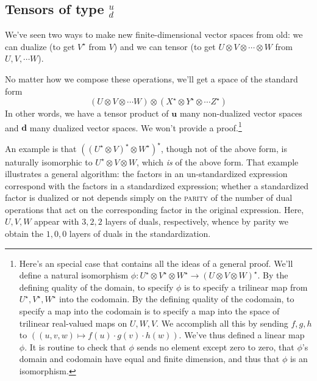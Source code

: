        \subsection{Tensors of type $^u_d$}
            We've seen two ways to make new finite-dimensional
            vector spaces from old: we can dualize (to get $V^\star$ from $V$)
            and we can tensor (to get $U\otimes V\otimes \cdots \otimes W$ from
            $U,V,\cdots W$).

            No matter how we compose these operations, we'll get a space of the
            standard form 
            $$
                (U \otimes
                V \otimes \cdots
                W) \otimes
                (X^\star \otimes
                Y^\star \otimes \cdots
                Z^\star)
            $$
            In other words, we have a tensor product of $\mathbf{u}$ many non-dualized
            vector spaces and $\mathbf{d}$ many dualized vector spaces.  We won't provide
            a proof.\footnote{
                Here's an special case that contains all the ideas of a general
                proof.
                We'll define a natural isomorphism $\phi:U^\star\otimes
                V^\star\otimes W^\star \to (U\otimes V\otimes W)^\star$.  By
                the defining quality of the domain, to specify $\phi$ is to
                specify a trilinear map from $U^\star, V^\star, W^\star$ into
                the codomain.  By the defining quality of the codomain, to
                specify a map into the codomain is to specify a map into the
                space of trilinear real-valued maps on $U, W, V$.  
                We accomplish all this by sending $f,g,h$ to $((u,v,w) \mapsto
                f(u)\cdot g(v)\cdot h(w))$.  We've thus defined a linear map
                $\phi$.  It is routine to check that $\phi$ sends no element
                except zero to zero, that $\phi$'s domain and codomain have
                equal and finite dimension, and thus that $\phi$ is an
                isomorphism.
            }

            An example is that $((U^\star \otimes V)^\star \otimes
            W^\star)^\star$, though not of the above form, is naturally
            isomorphic to $U^\star \otimes V \otimes W$, which \emph{is} of the
            above form.  That example illustrates a general algorithm: the
            factors in an un-standardized expression correspond with the
            factors in a standardized expression; whether a standardized factor
            is dualized or not depends simply on the \textsc{parity} of the
            number of dual operations that act on the corresponding factor in
            the original expression.  Here, $U,V,W$ appear with $3,2,2$ layers
            of duals, respectively, whence by parity we obtain the $1,0,0$
            layers of duals in the standardization.

